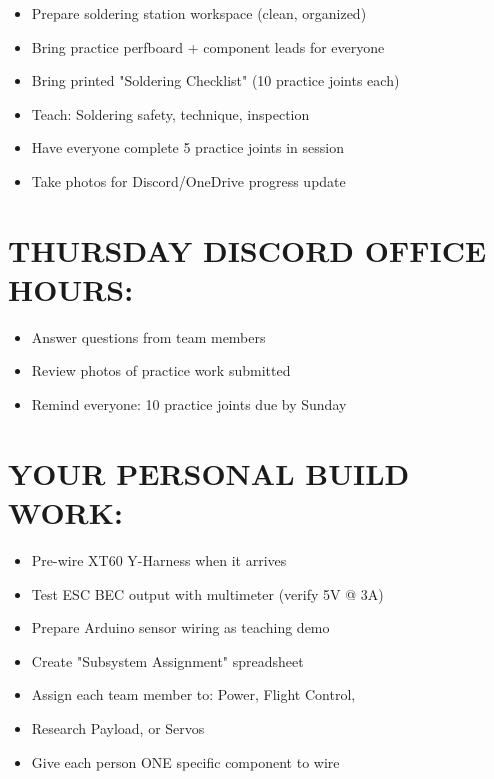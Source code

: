 \documentclass[11pt,letterpaper]{article}
\begin{document}
\begin{itemize}
  \item [WARNING]  [ ] Prepare soldering station workspace (clean, organized)
  \item [WARNING]  [ ] Bring practice perfboard + component leads for everyone
  \item [WARNING]  [ ] Bring printed "Soldering Checklist" (10 practice joints each)
  \item [WARNING]  [ ] Teach: Soldering safety, technique, inspection
  \item [WARNING]  [ ] Have everyone complete 5 practice joints in session
  \item [WARNING]  [ ] Take photos for Discord/OneDrive progress update
\end{itemize}

\section{THURSDAY DISCORD OFFICE HOURS:}

\begin{itemize}
  \item  [ ] Answer questions from team members
  \item  [ ] Review photos of practice work submitted
  \item  [ ] Remind everyone: 10 practice joints due by Sunday
\end{itemize}

\section{YOUR PERSONAL BUILD WORK:}

\begin{itemize}
  \item [WARNING]  [ ] Pre-wire XT60 Y-Harness when it arrives
  \item [WARNING]  [ ] Test ESC BEC output with multimeter (verify 5V @ 3A)
  \item [WARNING]  [ ] Prepare Arduino sensor wiring as teaching demo
\end{itemize}

\begin{itemize}
  \item  [ ] Create "Subsystem Assignment" spreadsheet
  \item Assign each team member to: Power, Flight Control,
  \item Research Payload, or Servos
  \item Give each person ONE specific component to wire
\end{itemize}
\end{document}
